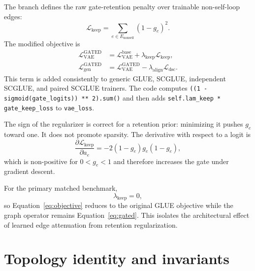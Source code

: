 \documentclass[11pt]{article}
\newcommand{\code}[1]{\texttt{#1}}
\begin{document}
The branch defines the raw gate-retention penalty over trainable non-self-loop
edges:
\begin{equation}
  \mathcal L_{\mathrm{keep}}=\sum_{e\in E_{\mathrm{nonself}}}(1-g_e)^2.
  \label{eq:keep}
\end{equation}
The modified objective is
\begin{align}
  \mathcal L_{\mathrm{VAE}}^{\mathrm{GATED}}
    &=\mathcal L_{\mathrm{VAE}}^{\mathrm{base}}
      +\lambda_{\mathrm{keep}}\mathcal L_{\mathrm{keep}},\\
  \mathcal L_{\mathrm{gen}}^{\mathrm{GATED}}
    &=\mathcal L_{\mathrm{VAE}}^{\mathrm{GATED}}
      -\lambda_{\mathrm{align}}\mathcal L_{\mathrm{dsc}}.
  \label{eq:objective}
\end{align}
This term is added consistently to generic GLUE, SCGLUE, independent SCGLUE,
and paired SCGLUE trainers.  The code computes
\code{((1 - sigmoid(gate\_logits)) ** 2).sum()} and then adds
\code{self.lam\_keep * gate\_keep\_loss} to \code{vae\_loss}.

The sign of the regularizer is correct for a retention prior: minimizing it
pushes $g_e$ toward one.  It does not promote sparsity.  The derivative with
respect to a logit is
\begin{equation}
  \frac{\partial\mathcal L_{\mathrm{keep}}}{\partial a_e}
  =-2(1-g_e)g_e(1-g_e),
\end{equation}
which is non-positive for $0<g_e<1$ and therefore increases the gate under
gradient descent.

For the primary matched benchmark,
\begin{equation}
  \boxed{\lambda_{\mathrm{keep}}=0},
\end{equation}
so Equation~\eqref{eq:objective} reduces to the original GLUE objective while
the graph operator remains Equation~\eqref{eq:gated}.  This isolates the
architectural effect of learned edge attenuation from retention regularization.

\section{Topology identity and invariants}
\end{document}
